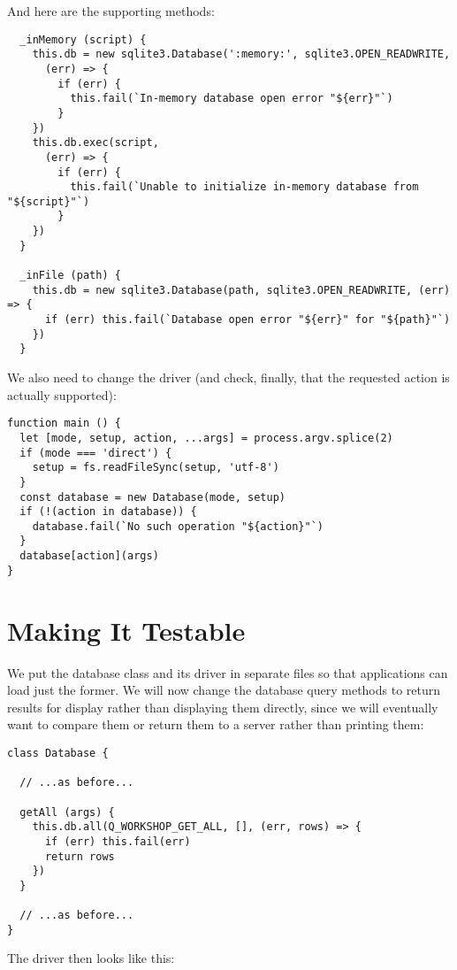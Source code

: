 \noindent
And here are the supporting methods:

\begin{verbatim}
  _inMemory (script) {
    this.db = new sqlite3.Database(':memory:', sqlite3.OPEN_READWRITE,
      (err) => {
        if (err) {
          this.fail(`In-memory database open error "${err}"`)
        }
    })
    this.db.exec(script,
      (err) => {
        if (err) {
          this.fail(`Unable to initialize in-memory database from "${script}"`)
        }
    })
  }

  _inFile (path) {
    this.db = new sqlite3.Database(path, sqlite3.OPEN_READWRITE, (err) => {
      if (err) this.fail(`Database open error "${err}" for "${path}"`)
    })
  }
\end{verbatim}

\noindent
We also need to change the driver
(and check, finally, that the requested action is actually supported):

\begin{verbatim}
function main () {
  let [mode, setup, action, ...args] = process.argv.splice(2)
  if (mode === 'direct') {
    setup = fs.readFileSync(setup, 'utf-8')
  }
  const database = new Database(mode, setup)
  if (!(action in database)) {
    database.fail(`No such operation "${action}"`)
  }
  database[action](args)
}
\end{verbatim}

\section{Making It Testable}\label{s:db-testable}

We put the database class and its driver in separate files
so that applications can load just the former.
We will now change the database query methods to return results for display
rather than displaying them directly,
since we will eventually want to compare them or return them to a server rather than printing them:

\begin{verbatim}
class Database {

  // ...as before...

  getAll (args) {
    this.db.all(Q_WORKSHOP_GET_ALL, [], (err, rows) => {
      if (err) this.fail(err)
      return rows
    })
  }

  // ...as before...
}
\end{verbatim}

The driver then looks like this:

